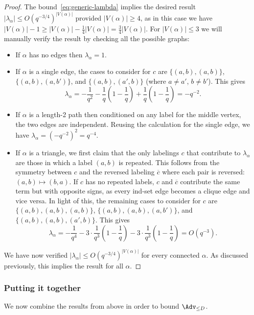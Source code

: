 \documentclass{article}
\begin{document}
\begin{proof}
The bound~\eqref{eq:generic-lambda} implies the desired result $|\lambda_\alpha| \le O(q^{-3/4})^{|V(\alpha)|}$ provided $|V(\alpha)| \ge 4$, as in this case we have $|V(\alpha)|-1 \ge |V(\alpha)| - \frac{1}{4}|V(\alpha)| = \frac{3}{4}|V(\alpha)|$. For $|V(\alpha)| \le 3$ we will manually verify the result by checking all the possible graphs:
\begin{itemize}
    \item If $\alpha$ has no edges then $\lambda_\alpha = 1$.
    \item If $\alpha$ is a single edge, the cases to consider for $c$ are $\{(a,b),(a,b)\}$, $\{(a,b),(a,b')\}$, and $\{(a,b),(a',b)\}$ (where $a \ne a'$, $b \ne b'$). This gives
    \[ \lambda_\alpha = -\frac{1}{q^2} -\frac{1}{q}\left(1-\frac{1}{q}\right) + \frac{1}{q}\left(1-\frac{1}{q}\right) = -q^{-2}. \]
    \item If $\alpha$ is a length-2 path then conditioned on any label for the middle vertex, the two edges are independent. Reusing the calculation for the single edge, we have $\lambda_\alpha = (-q^{-2})^2 = q^{-4}$.
    \item If $\alpha$ is a triangle, we first claim that the only labelings $c$ that contribute to $\lambda_\alpha$ are those in which a label $(a,b)$ is repeated. This follows from the symmetry between $c$ and the reversed labeling $\overline{c}$ where each pair is reversed: $(a,b) \mapsto (b,a)$. If $c$ has no repeated labels, $c$ and $\overline{c}$ contribute the same term but with opposite signs, as every ind-set edge becomes a clique edge and vice versa. In light of this, the remaining cases to consider for $c$ are $\{(a,b),(a,b),(a,b)\}$, $\{(a,b),(a,b),(a,b')\}$, and $\{(a,b),(a,b),(a',b)\}$. This gives
    \[ \lambda_\alpha = -\frac{1}{q^4} - 3 \cdot \frac{1}{q^3}\left(1-\frac{1}{q}\right) - 3 \cdot \frac{1}{q^3}\left(1-\frac{1}{q}\right) = O(q^{-3}). \]
\end{itemize}
We have now verified $|\lambda_\alpha| \le O(q^{-3/4})^{|V(\alpha)|}$ for every connected $\alpha$. As discussed previously, this implies the result for all $\alpha$.
\end{proof}



\subsubsection{Putting it together}

We now combine the results from above in order to bound $\Adv_{\le D}$.
\end{document}
